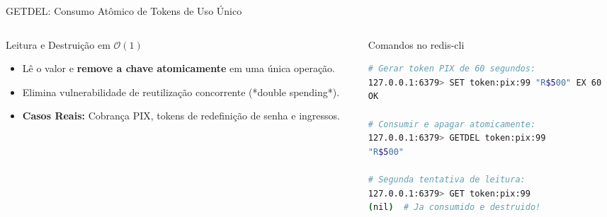 \begin{frame}[fragile]{GETDEL: Consumo Atômico de Tokens de Uso Único}
  \begin{columns}[T]
    \begin{column}{0.48\textwidth}
      \alert{Leitura e Destruição em $\mathcal{O}(1)$}\par
      \small
      \begin{itemize}
        \item Lê o valor e \textbf{remove a chave atomicamente} em uma única operação.
        \item Elimina vulnerabilidade de reutilização concorrente (*double spending*).
        \item \textbf{Casos Reais:} Cobrança PIX, tokens de redefinição de senha e ingressos.
      \end{itemize}
    \end{column}
    \begin{column}{0.50\textwidth}
      \alert{Comandos no redis-cli}\par
      \begin{lstlisting}[language=bash]
# Gerar token PIX de 60 segundos:
127.0.0.1:6379> SET token:pix:99 "R$500" EX 60
OK

# Consumir e apagar atomicamente:
127.0.0.1:6379> GETDEL token:pix:99
"R$500"

# Segunda tentativa de leitura:
127.0.0.1:6379> GET token:pix:99
(nil)  # Ja consumido e destruido!
      \end{lstlisting}
    \end{column}
  \end{columns}
\end{frame}

